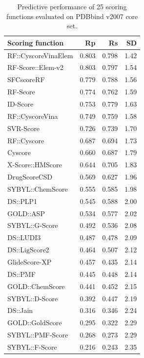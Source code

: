 \begin{table}
\caption{Predictive performance of 25 scoring functions evaluated on PDBbind v2007 core set.}
\label{rfcyscore:trn1105tst195}
\begin{tabular}{lrrr}
\hline
Scoring function & Rp & Rs & SD\\
\hline
RF::CyscoreVinaElem & 0.803 & 0.798 & 1.42\\
RF-Score::Elem-v2   & 0.803 & 0.797 & 1.54\\
SFCscoreRF          & 0.779 & 0.788 & 1.56\\
RF-Score            & 0.774 & 0.762 & 1.59\\
ID-Score            & 0.753 & 0.779 & 1.63\\
RF::CyscoreVina     & 0.749 & 0.759 & 1.58\\
SVR-Score           & 0.726 & 0.739 & 1.70\\
RF::Cyscore         & 0.687 & 0.694 & 1.73\\
Cyscore             & 0.660 & 0.687 & 1.79\\
X-Score::HMScore    & 0.644 & 0.705 & 1.83\\
DrugScoreCSD        & 0.569 & 0.627 & 1.96\\
SYBYL::ChemScore    & 0.555 & 0.585 & 1.98\\
DS::PLP1            & 0.545 & 0.588 & 2.00\\
GOLD::ASP           & 0.534 & 0.577 & 2.02\\
SYBYL::G-Score      & 0.492 & 0.536 & 2.08\\
DS::LUDI3           & 0.487 & 0.478 & 2.09\\
DS::LigScore2       & 0.464 & 0.507 & 2.12\\
GlideScore-XP       & 0.457 & 0.435 & 2.14\\
DS::PMF             & 0.445 & 0.448 & 2.14\\
GOLD::ChemScore     & 0.441 & 0.452 & 2.15\\
SYBYL::D-Score      & 0.392 & 0.447 & 2.19\\
DS::Jain            & 0.316 & 0.346 & 2.24\\
GOLD::GoldScore     & 0.295 & 0.322 & 2.29\\
SYBYL::PMF-Score    & 0.268 & 0.273 & 2.29\\
SYBYL::F-Score      & 0.216 & 0.243 & 2.35\\
\hline
\end{tabular}
\end{table}


